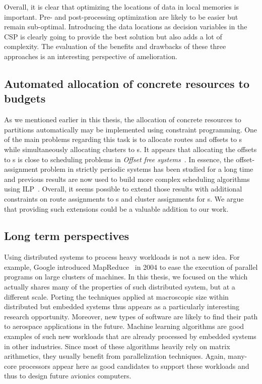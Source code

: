 \documentclass[main.tex]{subfiles}
\begin{document}
Overall, it is clear that optimizing the locations of data in local memories is important. Pre- and post-processing optimization are likely to be easier but remain sub-optimal. Introducing the data locations as decision variables in the CSP is clearly going to provide the best solution but also adds a lot of complexity. The evaluation of the benefits and drawbacks of these three approaches is an interesting perspective of amelioration.

\subsection{Automated allocation of concrete resources to budgets}
As we mentioned earlier in this thesis, the allocation of concrete resources to partitions automatically may be implemented using constraint programming. One of the main problems regarding this task is to allocate routes and offsets to \PC{}s while simultaneously allocating clusters to \PN{}s. It appears that allocating the offsets to \PC{}s is close to scheduling problems in \emph{Offset free systems}~\cite{Goossens03}. In essence, the offset-assignment problem in strictly periodic systems has been studied for a long time~\cite{Korst91} and previous results are now used to build more complex scheduling algorithms using ILP~\cite{Kermia09,Alsheikh11}. Overall, it seems possible to extend those results with additional constraints on route assignments to \PC{}s and cluster assignments for \PN{}s. We argue that providing such extensions could be a valuable addition to our work.


\subsection{Long term perspectives}
Using distributed systems to process heavy workloads is not a new idea. 
For example, Google introduced MapReduce~\cite{Dean2004} in 2004 to ease the execution of parallel programs on large clusters of machines. In this thesis, we focused on the \mppalong which actually shares many of the properties of such distributed system, but at a different scale. Porting the techniques applied at macroscopic size within distributed but embedded systems thus appears as a particularly interesting research opportunity. Moreover, new types of software are likely to find their path to aerospace applications in the future. Machine learning algorithms are good examples of such new workloads that are already processed by embedded systems in other industries. Since most of these algorithms heavily rely on matrix arithmetics, they usually benefit from parallelization techniques. Again, many-core processors appear here as good candidates to support these workloads and thus to design future avionics computers. 


\subbiblio
\end{document}
